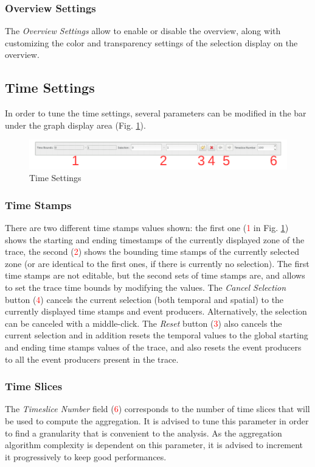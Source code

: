 \documentclass[twoside]{article}
\begin{document}
\begin{sloppypar}
\subsubsection{Overview Settings}
The \textit{Overview Settings} allow to enable or disable the overview, along with customizing the color and transparency settings of the selection display on the overview.


\subsection{Time Settings}
In order to tune the time settings, several parameters can be modified in the bar under the graph display area (Fig. \ref{timeSettings}).
 
\begin{figure}[h!]
	\centering
	\includegraphics[width=1.0\textwidth]{images/ocelotl_bottom_time.pdf}
	\caption{Time Settings}
	\label{timeSettings}
\end{figure}

\subsubsection{Time Stamps}
There are two different time stamps values shown: the first one (\textcolor{red}{1} in Fig. \ref{timeSettings}) shows the starting and ending timestamps of the currently displayed zone of the trace, the second (\textcolor{red}{2}) shows the bounding time stamps of the currently selected zone (or are identical to the first ones, if there is currently no selection). The first time stamps are not editable, but the second sets of time stamps are, and allows to set the trace time bounds by modifying the values. The \textit{Cancel Selection} button  (\textcolor{red}{4}) cancels the current selection (both temporal and spatial) to the currently displayed time stamps and event producers. Alternatively, the selection can be canceled with a middle-click. The \textit{Reset} button (\textcolor{red}{3}) also cancels the current selection and in addition resets the temporal values to the global starting and ending time stamps values of the trace, and also resets the event producers to all the event producers present in the trace.

\subsubsection{Time Slices}
The \textit{Timeslice Number} field (\textcolor{red}{6}) corresponds to the number of time slices that will be used to compute the aggregation. It is advised to tune this parameter in order to find a granularity that is convenient to the analysis. As the aggregation algorithm complexity is dependent on this parameter, it is advised to increment it progressively to keep good performances.


\end{sloppypar}
\end{document}
